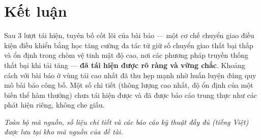 \documentclass[12pt,a4paper]{article}
\begin{document}
\section{Kết luận}

Sau 3 lượt tái hiện, tuyên bố cốt lõi của bài báo — một cơ chế chuyển giao điều kiện điều
khiển bằng học tăng cường đa tác tử giữ số chuyển giao thất bại thấp và ổn định trong chòm vệ
tinh mật độ cao, nơi các phương pháp truyền thống thất bại khi tải tăng — \textbf{đã tái hiện
được rõ ràng và vững chắc}. Khoảng cách với bài báo ở vùng tải cao nhất đã thu hẹp mạnh nhờ
huấn luyện đúng quy mô bài báo công bố. Một số chi tiết (thông lượng cao nhất, độ ổn định của
một biến thể hàm thưởng) chưa tái hiện được và đã được báo cáo trung thực như các phát hiện
riêng, không che giấu.

\vspace{1em}
\noindent\emph{Toàn bộ mã nguồn, số liệu chi tiết và các báo cáo kỹ thuật đầy đủ (tiếng Việt)
được lưu tại kho mã nguồn của đề tài.}
\end{document}
